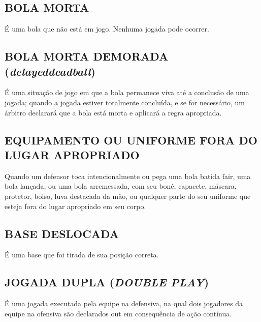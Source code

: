 \subsection{BOLA MORTA}
É uma bola que não está em jogo. Nenhuma jogada pode ocorrer.

\subsection{BOLA MORTA DEMORADA (\textit{delayeddeadball})}

É uma situação de jogo em que a bola permanece viva até a conclusão de uma jogada; quando a jogada estiver totalmente concluída, e se for necessário, um árbitro declarará que a bola está morta e aplicará a regra apropriada.

\subsection{EQUIPAMENTO  OU UNIFORME FORA DO LUGAR APROPRIADO}

Quando um defensor toca intencionalmente ou pega uma bola batida \gls{fair}, uma bola lançada, ou uma bola arremessada, com seu boné, capacete, máscara, protetor, bolso, luva destacada da mão, ou qualquer parte do seu uniforme que esteja fora do lugar apropriado em seu corpo.

\subsection{BASE DESLOCADA}
É uma base que foi tirada de sua posição correta.
\subsection{JOGADA DUPLA (\textit{DOUBLE PLAY})}
É uma jogada executada pela equipe na defensiva, na qual dois jogadores da equipe na ofensiva são declarados \gls{out} em consequência de ação contínua.

